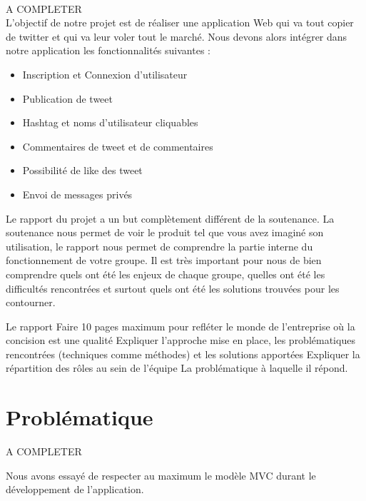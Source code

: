\documentclass[a4paper, 12pt]{article}
\begin{document}
	\paragraph{}
	\large{A COMPLETER}\\
		L'objectif de notre projet est de réaliser une application Web qui va tout copier de twitter et qui va leur voler tout le marché. Nous devons alors intégrer dans notre application les fonctionnalités suivantes : 
\begin{itemize}
\item Inscription et Connexion d'utilisateur
\item Publication de tweet 
\item Hashtag et noms d'utilisateur cliquables
\item Commentaires de tweet et de commentaires
\item Possibilité de like des tweet
\item Envoi de messages privés
\end{itemize}
	



Le rapport du projet a un but complètement différent de la soutenance. La soutenance nous permet de voir le produit tel que vous avez imaginé son utilisation, le rapport nous permet de comprendre la partie interne du fonctionnement de votre groupe. Il est très important pour nous de bien comprendre quels ont été les enjeux de chaque groupe, quelles ont été les difficultés rencontrées et surtout quels ont été les solutions trouvées pour les contourner.


Le rapport
Faire 10 pages maximum pour refléter le monde de l’entreprise où la concision est une qualité
Expliquer l’approche mise en place, les problématiques rencontrées (techniques comme méthodes) et les solutions apportées
Expliquer la répartition des rôles au sein de l’équipe
La problématique à laquelle il répond.

\newpage
\section{Problématique}	
	\large{A COMPLETER}

Nous avons essayé de respecter au maximum le modèle MVC durant le développement de l'application.
\end{document}
